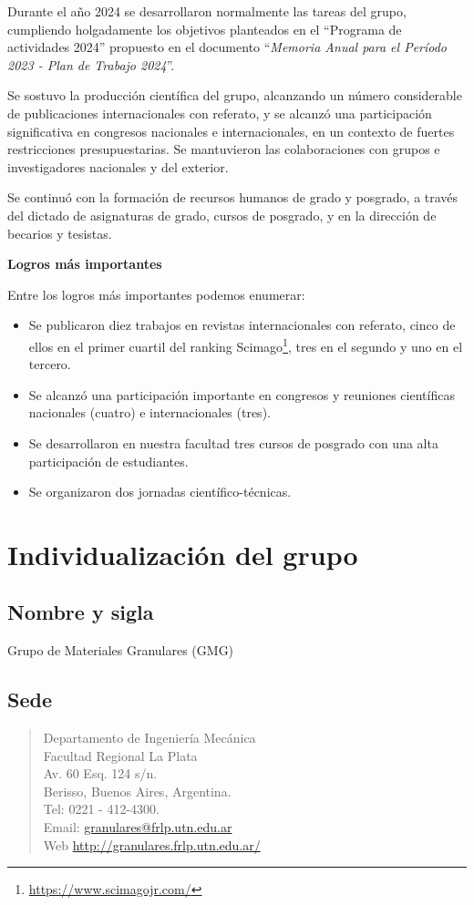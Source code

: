 \documentclass[a4paper,11pt,twoside,final,titlepage,onecolumn,openright]{report}
\begin{document}
Durante el año 2024 se desarrollaron normalmente las tareas del grupo, cumpliendo holgadamente los objetivos planteados en el ``Programa de actividades 2024'' propuesto en el documento ``\textit{Memoria Anual para el Período 2023 - Plan de Trabajo 2024}''. 

Se sostuvo la producción científica del grupo, alcanzando un número considerable de publicaciones internacionales con referato, y se alcanzó una participación significativa en congresos nacionales e internacionales, en un contexto de fuertes restricciones presupuestarias. Se mantuvieron las colaboraciones con grupos e investigadores nacionales y del exterior.

Se continuó con la formación de recursos humanos de grado y posgrado, a través del dictado de asignaturas de grado, cursos de posgrado, y en la dirección de becarios y tesistas.

\vspace{0.5cm}

{\bf Logros más importantes}

Entre los logros más importantes podemos enumerar:

\begin{itemize}
\item Se publicaron diez trabajos en revistas internacionales con referato, cinco de ellos en el primer cuartil del ranking Scimago\footnote{\url{https://www.scimagojr.com/}}, tres en el segundo y uno en el tercero.
\item Se alcanzó una participación importante en congresos y reuniones científicas nacionales (cuatro) e internacionales (tres).
\item Se desarrollaron en nuestra facultad tres cursos de posgrado con una alta participación de estudiantes.
\item Se organizaron dos jornadas científico-técnicas.
\end{itemize}


\section{Individualización del grupo}

\subsection{Nombre y sigla}
 Grupo de Materiales Granulares (GMG)

 \subsection{Sede}
\begin{quote}
Departamento de Ingeniería Mecánica \\
Facultad Regional La Plata\\
Av. 60 Esq. 124 s/n.\\
Berisso, Buenos Aires, Argentina. \\
Tel: 0221 - 412-4300. \\
Email: \href{mailto://granulares@frlp.utn.edu.ar}{granulares@frlp.utn.edu.ar} \\
Web \href{http://granulares.frlp.utn.edu.ar/}{http://granulares.frlp.utn.edu.ar/}
\end{quote}
\end{document}
